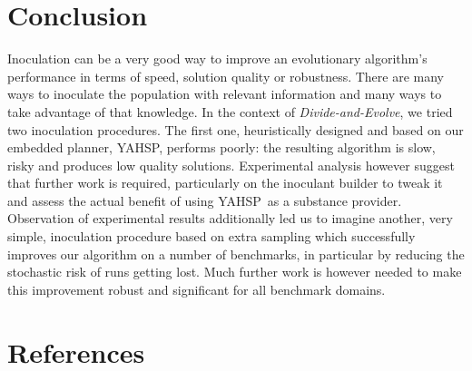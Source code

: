 \documentclass[english]{DESCARWINreport}
\newcommand{\dae}{{\em Divide-and-Evolve}}
\newcommand{\YAHSP}{{\sc YAHSP}}
\begin{document}
\newpage
\chapter{Conclusion}

Inoculation can be a very good way to improve an evolutionary algorithm's performance in terms of speed, solution quality or robustness. There are many ways to inoculate the population with relevant information and many ways to take advantage of that knowledge. In the context of \dae, we tried two inoculation procedures. The first one, heuristically designed and based on our embedded planner, \YAHSP, performs poorly: the resulting algorithm is slow, risky and produces low quality solutions. Experimental analysis however suggest that further work is required, particularly on the inoculant builder to tweak it and assess the actual benefit of using \YAHSP\ as a substance provider. Observation of experimental results additionally led us to imagine another, very simple, inoculation procedure based on extra sampling which successfully improves our algorithm on a number of benchmarks, in particular by reducing the stochastic risk of runs getting lost. Much further work is however needed to make this improvement robust and significant for all benchmark domains.

\newpage
\newpage
\chapter{References}





%
%
%
\end{document}
